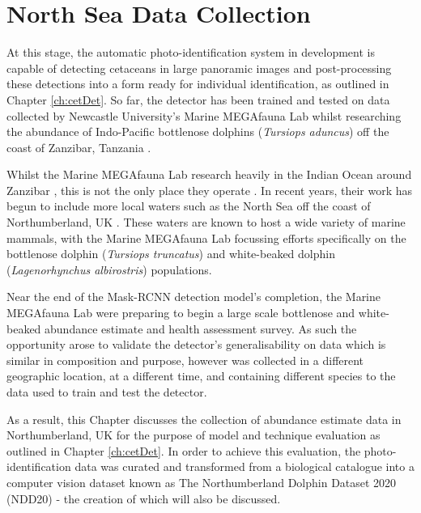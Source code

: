 \chapter{North Sea Data Collection} \label{ch:NDD}

At this stage, the automatic photo-identification system in development is capable of detecting cetaceans in large panoramic images and post-processing these detections into a form ready for individual identification, as outlined in Chapter \ref{ch:cetDet}. So far, the detector has been trained and tested on data collected by Newcastle University's Marine MEGAfauna Lab whilst researching the abundance of Indo-Pacific bottlenose dolphins (\textit{Tursiops aduncus}) off the coast of Zanzibar, Tanzania \cite{sharpe_indian_2019}. 

Whilst the Marine MEGAfauna Lab research heavily in the Indian Ocean around Zanzibar \cite{yang_description_2020, temple_life-history_2020, temple_marine_2019, temple_marine_2018, weigmann_revision_2020, barrowclift_social_2017}, this is not the only place they operate \cite{temple_by-catch_2021, yang_classification_2017, yang_influence_2022}. In recent years, their work has begun to include more local waters such as the North Sea off the coast of Northumberland, UK \cite{van_bressem_visual_2018, yang_characterization_2021}. These waters are known to host a wide variety of marine mammals, with the Marine MEGAfauna Lab focussing efforts specifically on the bottlenose dolphin (\textit{Tursiops truncatus}) and white-beaked dolphin (\textit{Lagenorhynchus albirostris}) populations. 

Near the end of the Mask-RCNN detection model's completion, the Marine MEGAfauna Lab were preparing to begin a large scale bottlenose and white-beaked abundance estimate and health assessment survey. As such the opportunity arose to validate the detector's generalisability on data which is similar in composition and purpose, however was collected in a different geographic location, at a different time, and containing different species to the data used to train and test the detector.

As a result, this Chapter discusses the collection of abundance estimate data in Northumberland, UK for the purpose of model and technique evaluation as outlined in Chapter \ref{ch:cetDet}. In order to achieve this evaluation, the photo-identification data was curated and transformed from a biological catalogue into a computer vision dataset known as The Northumberland Dolphin Dataset 2020 (NDD20) - the creation of which will also be discussed. 

